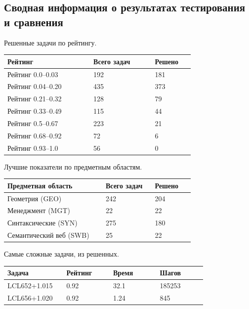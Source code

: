 \subsection{Сводная информация о результатах тестирования и сравнения}

Решенные задачи по рейтингу.

\begin{longtable}[H]{|p{0.35\linewidth}|p{0.25\linewidth}|p{0.15\linewidth}|}
\hline
\textbf{Рейтинг} & \textbf{Всего задач} & \textbf{Решено} \\
\hline
Рейтинг 0.0--0.03 & 192 & 181 \\
\hline
Рейтинг 0.04--0.20 & 435 & 373 \\
\hline
Рейтинг 0.21--0.32 & 128 & 79 \\
\hline
Рейтинг 0.33--0.49 & 115 & 44 \\
\hline
Рейтинг 0.5--0.67 & 223 & 21 \\
\hline
Рейтинг 0.68--0.92 & 72 & 6 \\
\hline
Рейтинг 0.93--1.0 & 56 & 0\\
\hline
\end{longtable}


Лучшие показатели по предметным областям.

\begin{longtable}[H]{|p{0.4\linewidth}|p{0.2\linewidth}|p{0.15\linewidth}|}
\hline
\textbf{Предметная область} & \textbf{Всего задач} & \textbf{Решено} \\
\hline
Геометрия (GEO) & 242 & 204 \\
\hline
Менеджмент (MGT) & 22 & 22 \\
\hline
Синтаксические (SYN) & 275 & 180 \\
\hline
Семантический веб (SWB) & 25 & 22 \\
\hline
\end{longtable}


Самые сложные задачи, из решенных.

\begin{longtable}[H]{|p{0.2\linewidth}|p{0.2\linewidth}|p{0.2\linewidth}|p{0.2\linewidth}|}
\hline
\textbf{Задача} & \textbf{Рейтинг} & \textbf{Время} & \textbf{Шагов} \\
\hline
LCL652+1.015 & 0.92 & 32.1 & 185253 \\
\hline
LCL656+1.020 & 0.92 & 1.24 & 845 \\
\hline
\end{longtable}



